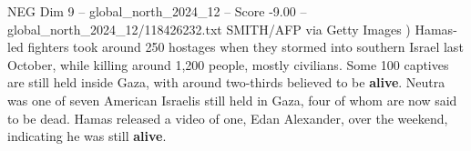 \begin{textsample}{NEG Dim 9 – global\_north\_2024\_12 – Score -9.00 – global\_north\_2024\_12/118426232.txt}
SMITH/AFP via Getty Images ) Hamas-led fighters took around 250 hostages when they stormed into southern Israel last October, while killing around 1,200 people, mostly civilians.
Some 100 captives are still held inside Gaza, with around two-thirds believed to be \textbf{alive}.
Neutra was one of seven American Israelis still held in Gaza, four of whom are now said to be dead.
Hamas released a video of one, Edan Alexander, over the weekend, indicating he was still \textbf{alive}.

\end{textsample}
